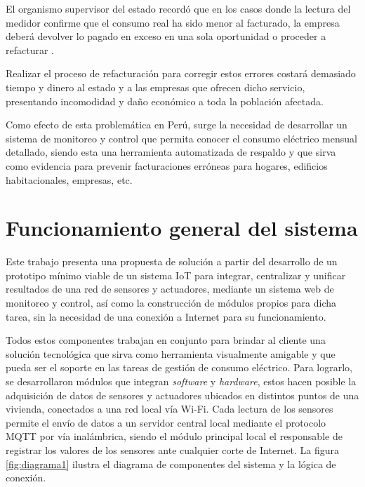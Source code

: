 El organismo supervisor del estado recordó que en los casos donde la lectura del medidor confirme que el consumo real ha sido menor al facturado, la empresa deberá devolver lo pagado en exceso en una sola oportunidad o proceder a refacturar \citep{WEBSITE:2}.

Realizar el proceso de refacturación para corregir estos errores costará demasiado tiempo y dinero al estado y a las empresas que ofrecen dicho servicio, presentando incomodidad y daño económico a toda la población afectada. 

Como efecto de esta problemática en Perú, surge la necesidad de desarrollar un sistema de monitoreo y control que permita conocer el consumo eléctrico mensual detallado, siendo esta una herramienta automatizada de respaldo y que sirva como evidencia para prevenir facturaciones erróneas para hogares, edificios habitacionales, empresas, etc.




\section{Funcionamiento general del sistema}

Este trabajo presenta una propuesta de solución a partir del desarrollo de un prototipo mínimo viable de un sistema IoT para integrar, centralizar y unificar resultados de una red de sensores y actuadores, mediante un sistema web de monitoreo y control, así como la construcción de módulos propios para dicha tarea, sin la necesidad de una conexión a Internet para su funcionamiento. 

Todos estos componentes trabajan en conjunto para brindar al cliente una solución tecnológica que sirva como herramienta visualmente amigable y que pueda ser el soporte en las tareas de gestión de consumo eléctrico. Para lograrlo, se desarrollaron módulos que integran \emph{software} y \emph{hardware}, estos hacen posible la adquisición de datos de sensores y actuadores ubicados en distintos puntos de una vivienda, conectados a una red local vía Wi-Fi. Cada lectura de los sensores permite el envío de datos a un servidor central local mediante el protocolo MQTT por vía inalámbrica, siendo el módulo principal local el responsable de registrar los valores de los sensores ante cualquier corte de Internet. La figura \ref{fig:diagrama1} ilustra el diagrama de componentes del sistema y la lógica de conexión.

